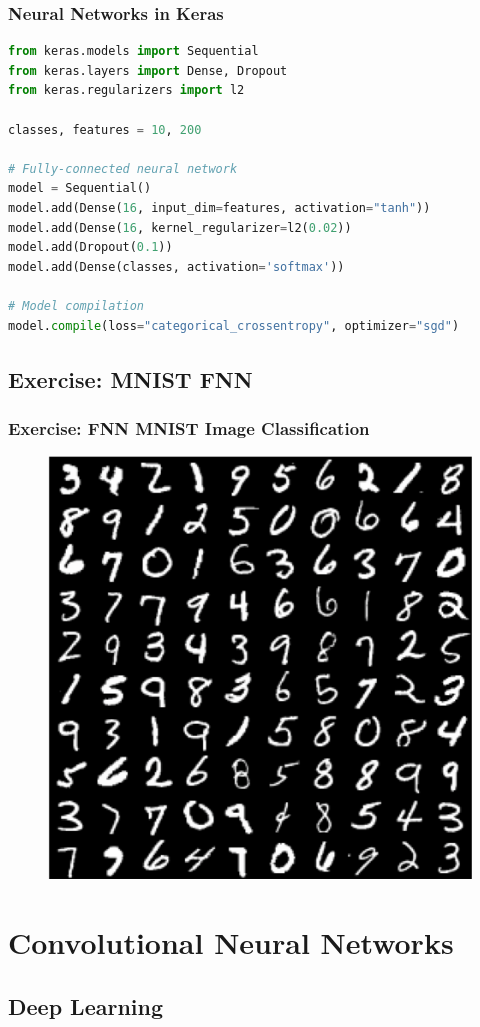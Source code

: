 \documentclass[aspectratio=169]{beamer}
\begin{document}
\begin{frame}[fragile]
\frametitle{Neural Networks in Keras}

\begin{lstlisting}[language=Python]
from keras.models import Sequential
from keras.layers import Dense, Dropout
from keras.regularizers import l2

classes, features = 10, 200

# Fully-connected neural network
model = Sequential()
model.add(Dense(16, input_dim=features, activation="tanh"))
model.add(Dense(16, kernel_regularizer=l2(0.02))
model.add(Dropout(0.1))
model.add(Dense(classes, activation='softmax'))

# Model compilation
model.compile(loss="categorical_crossentropy", optimizer="sgd")
\end{lstlisting}

\end{frame}

\subsection{Exercise: MNIST FNN}
\label{subsec:exercise-fnn}

\begin{frame}
    \frametitle{Exercise: FNN MNIST Image Classification}
    
    \begin{figure}
        \centering
        \includegraphics[width=0.4\linewidth]{mnist.png}
    \end{figure}
\end{frame}

\section{Convolutional Neural Networks}
\label{sec:convolutional-neural-networks}

\subsection{Deep Learning}
\label{subsec:deep-learning}
\end{document}
